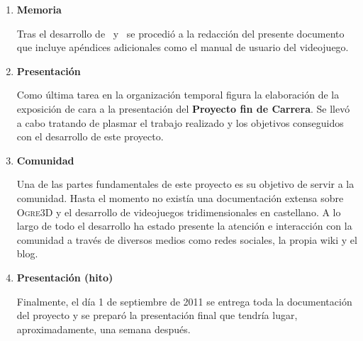 \begin{enumerate}
\begin{enumerate}
    \end{enumerate}
    \item \textbf{Memoria}
    
    Tras el desarrollo de \wiki\ y \juego\ se procedió a la redacción
    del presente documento que incluye apéndices adicionales como el 
    manual de usuario del videojuego.\\
    
    \item \textbf{Presentación}
    
    Como última tarea en la organización temporal figura la elaboración
    de la exposición de cara a la presentación del \textbf{Proyecto fin
    de Carrera}. Se llevó a cabo tratando de plasmar el trabajo realizado
    y los objetivos conseguidos con el desarrollo de este proyecto.\\
    
    \item \textbf{Comunidad}
    
    Una de las partes fundamentales de este proyecto es su objetivo de servir
    a la comunidad. Hasta el momento no existía una documentación extensa
    sobre \textsc{Ogre3D} y el desarrollo de videojuegos tridimensionales
    en castellano. A lo largo de todo el desarrollo ha estado presente la
    atención e interacción con la comunidad a través de diversos medios
    como redes sociales, la propia wiki y el blog.\\
    
    \item \textbf{Presentación (hito)}
    
    Finalmente, el día 1 de septiembre de 2011 se entrega toda la documentación
    del proyecto y se preparó la presentación final que tendría lugar,
    aproximadamente, una semana después.\\
    
\end{enumerate}
